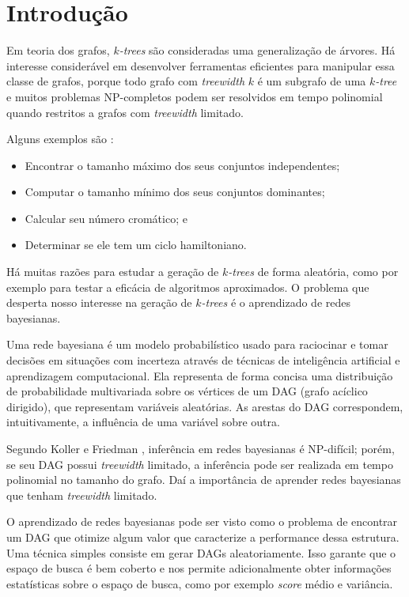 \chapter{Introdução}
\label{cap:introducao}

Em teoria dos grafos, \emph{$k$-trees} são consideradas uma generalização de árvores. Há interesse considerável em desenvolver ferramentas eficientes para manipular essa classe de grafos, porque todo grafo com \emph{treewidth} $k$ é um subgrafo de uma \emph{$k$-tree} e muitos problemas NP-completos podem ser resolvidos em tempo polinomial quando restritos a grafos com \emph{treewidth} limitado.

Alguns exemplos são \cite{arnborg}:

\begin{itemize}
  \item Encontrar o tamanho máximo dos seus conjuntos independentes;
  \item Computar o tamanho mínimo dos seus conjuntos dominantes;
  \item Calcular seu número cromático; e
  \item Determinar se ele tem um ciclo hamiltoniano.
\end{itemize}

Há muitas razões para estudar a geração de \emph{$k$-trees} de forma aleatória, como por exemplo para testar a eficácia de algoritmos aproximados. O problema que desperta nosso interesse na geração de \emph{$k$-trees} é o aprendizado de redes bayesianas.

Uma rede bayesiana é um modelo probabilístico usado para raciocinar e tomar decisões em situações com incerteza através de técnicas de inteligência artificial e aprendizagem computacional. Ela representa de forma concisa uma distribuição de probabilidade multivariada sobre os vértices de um DAG (grafo acíclico dirigido), que representam variáveis aleatórias. As arestas do DAG correspondem, intuitivamente, a influência de uma variável sobre outra.

Segundo Koller e Friedman \cite{koller}, inferência em redes bayesianas é NP-difícil; porém, se seu DAG possui \emph{treewidth} limitado, a inferência pode ser realizada em tempo polinomial no tamanho do grafo. Daí a importância de aprender redes bayesianas que tenham \emph{treewidth} limitado.

O aprendizado de redes bayesianas pode ser visto como o problema de encontrar um DAG que otimize algum valor que caracterize a performance dessa estrutura. Uma técnica simples consiste em gerar DAGs aleatoriamente. Isso garante que o espaço de busca é bem coberto e nos permite adicionalmente obter informações estatísticas sobre o espaço de busca, como por exemplo \emph{score} médio e variância.

